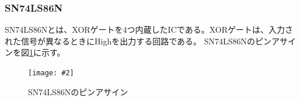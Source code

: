 \documentclass[a4paper,11pt,dvipdfmx]{jsarticle}
\newcommand{\Figure}[4]{
  \begin{figure}[H]
    \centering
    \texttt{[image: \#2]}
    \caption{#3}
    \label{fig:#4}
  \end{figure}
}
\begin{document}
\subsubsection{SN74LS86N}
SN74LS86Nとは、XORゲートを4つ内蔵したICである。XORゲートは、入力された信号が異なるときにHighを出力する回路である。
SN74LS86Nのピンアサインを図\ref{fig:XOR}に示す。
\Figure{0.4}{./images/74LS86.png}{SN74LS86Nのピンアサイン}{XOR}


\end{document}
